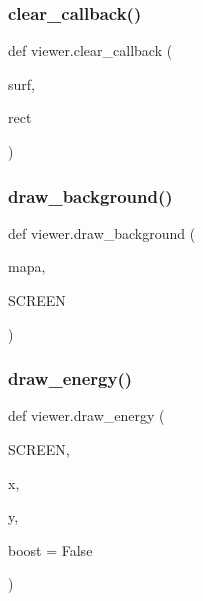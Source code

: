 \subsubsection{\texorpdfstring{clear\+\_\+callback()}{clear\_callback()}}
{\footnotesize\ttfamily def viewer.\+clear\+\_\+callback (\begin{DoxyParamCaption}\item[{}]{surf,  }\item[{}]{rect }\end{DoxyParamCaption})}

\mbox{\label{namespaceviewer_a1907ec5a9737fd37e3d6401cedfe3c86}} 
\subsubsection{\texorpdfstring{draw\+\_\+background()}{draw\_background()}}
{\footnotesize\ttfamily def viewer.\+draw\+\_\+background (\begin{DoxyParamCaption}\item[{}]{mapa,  }\item[{}]{S\+C\+R\+E\+EN }\end{DoxyParamCaption})}

\mbox{\label{namespaceviewer_a2d2685c19dd8912cb8999147b8774a39}} 
\subsubsection{\texorpdfstring{draw\+\_\+energy()}{draw\_energy()}}
{\footnotesize\ttfamily def viewer.\+draw\+\_\+energy (\begin{DoxyParamCaption}\item[{}]{S\+C\+R\+E\+EN,  }\item[{}]{x,  }\item[{}]{y,  }\item[{}]{boost = {\ttfamily False} }\end{DoxyParamCaption})}

\mbox{\label{namespaceviewer_ad78eceb6648e8eadcdcb58cf7d161dfb}} 
